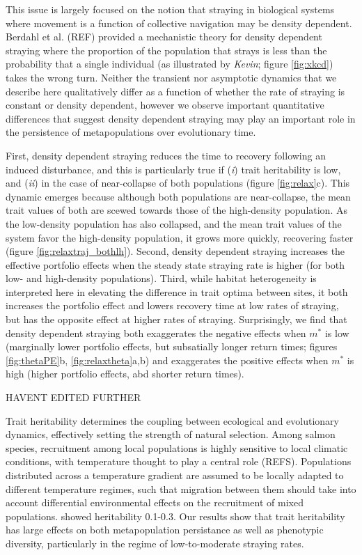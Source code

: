 \documentclass[twocolumn,preprintnumbers,amsmath,amssymb,superscriptaddress]{revtex4}
\begin{document}
This issue is largely focused on the notion that straying in biological systems where movement is a function of collective navigation may be density dependent.
Berdahl et al. (REF) provided a mechanistic theory for density dependent straying where the proportion of the population that strays is less than the probability that a single individual (as illustrated by \emph{Kevin}; figure \ref{fig:xkcd}) takes the wrong turn.
Neither the transient nor asymptotic dynamics that we describe here qualitatively differ as a function of whether the rate of straying is constant or density dependent, however we observe important quantitative differences that suggest density dependent straying may play an important role in the persistence of metapopulations over evolutionary time.

First, density dependent straying reduces the time to recovery following an induced disturbance, and this is particularly true if (\emph{i}) trait heritability is low, and (\emph{ii}) in the case of near-collapse of both populations (figure \ref{fig:relax}c).
This dynamic emerges because although both populations are near-collapse, the mean trait values of both are scewed towards those of the high-density population.
As the low-density population has also collapsed, and the mean trait values of the system favor the high-density population, it grows more quickly, recovering faster (figure \ref{fig:relaxtraj_bothlh}).
Second, density dependent straying increases the effective portfolio effects when the steady state straying rate is higher (for both low- and high-density populations).
Third, while habitat heterogeneity is interpreted here in elevating the difference in trait optima between sites, it both increases the portfolio effect and lowers recovery time at low rates of straying, but has the opposite effect at higher rates of straying.
Surprisingly, we find that density dependent straying both exaggerates the negative effects when $m^*$ is low (marginally lower portfolio effects, but subsatially longer return times; figures \ref{fig:thetaPE}b, \ref{fig:relaxtheta}a,b) and exaggerates the positive effects when $m^*$ is high (higher portfolio effects, abd shorter return times). 



HAVENT EDITED FURTHER

Trait heritability determines the coupling between ecological and evolutionary dynamics, effectively setting the strength of natural selection.
Among salmon species, recruitment among local populations is highly sensitive to local climatic conditions, with temperature thought to play a central role (REFS).
Populations distributed across a temperature gradient are assumed to be locally adapted to different temperature regimes, such that migration between them should take into account differential environmental effects on the recruitment of mixed populations.
\citeauthor{Carlson:2008hl} showed heritability 0.1-0.3.
Our results show that trait heritability has large effects on both metapopulation persistance as well as phenotypic diversity, particularly in the regime of low-to-moderate straying rates.
\end{document}

